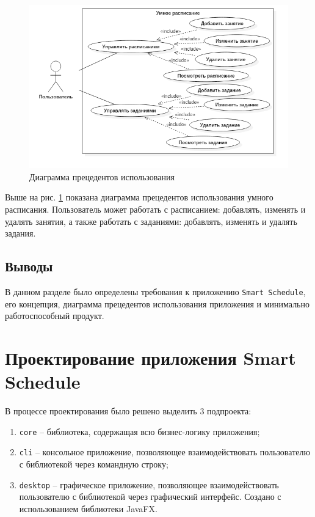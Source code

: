 \begin{figure}[H]
	\begin{center}
		\includegraphics[scale=0.7]{pics/usecase}
		\caption{Диаграмма прецедентов использования} 
		\label{pic:use_case_diagram} %
	\end{center}
\end{figure}

Выше на рис. \ref{pic:use_case_diagram} показана диаграмма прецедентов использования умного расписания. Пользователь может работать с расписанием: добавлять, изменять и удалять занятия, а также работать с заданиями: добавлять, изменять и удалять задания.

\subsection{Выводы}
В данном разделе было определены требования к приложению \texttt{Smart Schedule}, его концепция, диаграмма прецедентов использования приложения и минимально работоспособный продукт.

\section{Проектирование приложения Smart Schedule}

В процессе проектирования было решено выделить 3 подпроекта:
\begin{enumerate}
\item \texttt{core} -- библиотека, содержащая всю бизнес-логику приложения;
\item \texttt{cli} -- консольное приложение, позволяющее взаимодействовать пользователю с библиотекой через командную строку;
\item \texttt{desktop} -- графическое приложение, позволяющее взаимодействовать пользователю с библиотекой через графический интерфейс. Создано с использованием библиотеки JavaFX.
\end{enumerate}

